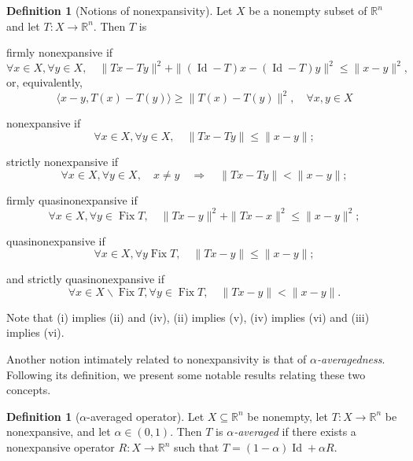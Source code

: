\documentclass[smallextended,numbook,nospthms]{svjour3}
\theoremstyle{plain}
\theoremstyle{definition}
\newtheorem{definition}[theorem]{Definition}
\def\RR{\mathds R}
\DeclareMathOperator{\Id}{Id}
\DeclareMathOperator{\Fix}{Fix}
\begin{document}
\begin{definition}[Notions of nonexpansivity]\label{def:nonexp}
Let $X$ be a nonempty subset of $\RR^n$ and let $T: X \rightarrow \RR^n$. Then $T$ is
\begin{listi}
    \item firmly nonexpansive if
    \[
    \forall x \in X, \forall y \in X, \quad\|T x-T y\|^{2}+\|(\Id-T) x-(\Id-T) y\|^{2} \leqslant\|x-y\|^{2},
    \]
    or, equivalently,
    \[
    \langle x-y, T(x)-T(y)\rangle \geq\|T(x)-T(y)\|^{2}, \quad \forall x, y \in X
    \]
    \item nonexpansive if
    \[
    \forall x \in X, \forall y \in X, \quad\|T x-T y\| \leqslant\|x-y\|;
    \]
    \item strictly nonexpansive if
    \[
    \forall x \in X,\forall y \in X, \quad x \neq y \quad \Rightarrow \quad\|Tx-Ty\|<\|x-y\|;
    \]
    \item firmly quasinonexpansive if
    \[
    \forall x \in X, \forall y \in \Fix T, \quad\|T x-y\|^{2}+\|T x-x\|^{2} \leqslant\|x-y\|^{2};
    \]
    \item quasinonexpansive if
    \[
    \forall x \in X, \forall y \Fix T, \quad\|T x-y\| \leqslant\|x-y\|;
    \]
    \item and strictly quasinonexpansive if
    \[
    \forall x \in X \backslash \Fix T, \forall y \in \Fix T, \quad\|Tx-y\|<\|x-y\| .
    \]
\end{listi}
Note that (i) implies (ii) and (iv), (ii) implies (v), (iv) implies (vi) and (iii) implies (vi).
\end{definition}

Another notion intimately related to nonexpansivity is that of \emph{$\alpha$-averagedness}. Following its definition, we present some notable results relating these two concepts.

\begin{definition}[$\alpha$-averaged operator]\label{def:alpha-avg}
Let $X \subseteq \RR^{n}$ be nonempty, let $T: X \rightarrow \RR^n$ be nonexpansive, and let $\alpha \in (0,1)$. Then $T$ is \emph{$\alpha$-averaged} if there exists a nonexpansive operator $R: X \rightarrow \RR^n$ such that $T=(1-\alpha) \Id+\alpha R$.
\end{definition}
\end{document}
